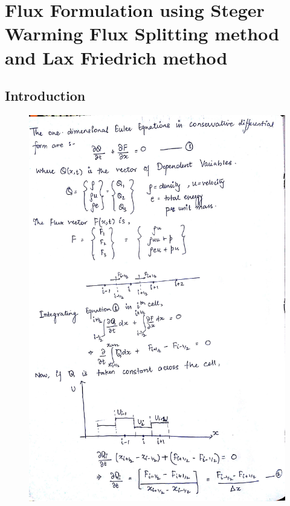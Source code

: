 \documentclass{article}
\begin{document}
\section*{Flux Formulation using Steger Warming Flux Splitting method and Lax Friedrich method}

\subsection*{Introduction}
\begin{figure}[H]   \label{figure}
\includegraphics[width=14cm]{one.jpg}
\label{figure:}
\end{figure}
\newpage
\end{document}
